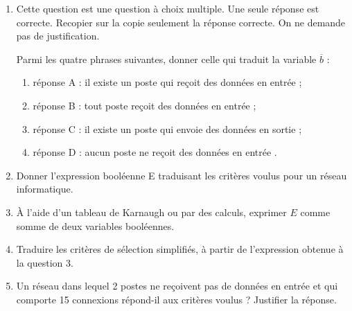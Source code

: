 \documentclass[a4paper,12pt]{article}
\begin{document}
\medskip

\begin{enumerate}[\bfseries 1.]
	\item Cette question est une question à choix multiple. Une seule réponse est correcte. Recopier sur la copie seulement la réponse correcte. On ne demande pas de justification.

	Parmi les quatre phrases suivantes, donner celle qui traduit la variable $\overline{b}$ :

	\setlength\parindent{9mm}
	\begin{enumerate}[\textbullet]
		\item réponse A : \og il existe un poste qui reçoit des données en entrée \fg{} ;
		\item réponse B : \og tout poste reçoit des données en entrée \fg{} ;
		\item réponse C : \og il existe un poste qui envoie des données en sortie \fg{} ;
		\item réponse D : \og aucun poste ne reçoit des données en entrée \fg.
	\end{enumerate}
	\setlength\parindent{0mm}

	\item Donner l'expression booléenne E traduisant les critères voulus pour un réseau informatique.
	\item À l'aide d'un tableau de Karnaugh ou par des calculs, exprimer $E$ comme somme de deux
	variables booléennes.
	\item Traduire les critères de sélection simplifiés, à partir de l'expression obtenue à la question 3.
	\item Un réseau dans lequel 2 postes ne reçoivent pas de données en entrée et qui comporte 15
	connexions répond-il aux critères voulus ? Justifier la réponse.\\
\end{enumerate}
\end{document}
